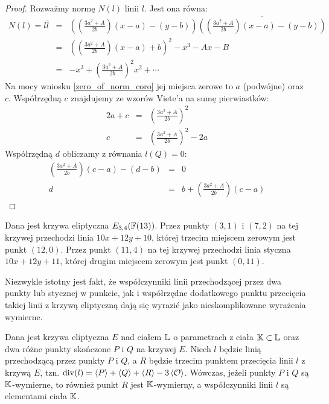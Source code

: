 \begin{proof}
Rozważmy normę $N(l)$ linii $l$. Jest ona równa:
\begin{eqnarray*}
N(l) = l\overline{l}
& = & \left(\left(\frac{3a^2 + A}{2b}\right)(x - a) - (y - b)\right)
      \overline{
      \left(\left(\frac{3a^2 + A}{2b}\right)(x - a) - (y - b)\right)
      } \\
& = & \left(\left(\frac{3a^2+A}{2b}\right)(x-a) + b\right)^2 - x^3 - Ax - B \\
& = & -x^3 + \left(\frac{3a^2+A}{2b}\right)^2x^2 + \cdots
\end{eqnarray*}
Na mocy wniosku \ref{zero_of_norm_coro}
jej miejsca zerowe to $a$ (podwójne) oraz $c$.
Współrzędną $c$ znajdujemy ze wzorów Viete'a na sumę pierwiastków:
\begin{eqnarray*}
2a + c & = & \left(\frac{3a^2+A}{2b}\right)^2 \\
     c & = & \left(\frac{3a^2+A}{2b}\right)^2 - 2a
\end{eqnarray*}
Współrzędną $d$ obliczamy z równania $l(Q) = 0$:
\begin{eqnarray*}
\left(\frac{3a^2 + A}{2b}\right)(c - a) - (d - b) & = & 0 \\
d & = & b + \left(\frac{3a^2 + A}{2b}\right)(c - a)
\end{eqnarray*}
\end{proof}

\begin{example}
Dana jest krzywa eliptyczna $E_{3,4}(\mathbb{F}(13))$.
Przez punkty $(3, 1)$ i $(7, 2)$ na tej krzywej
przechodzi linia $10x + 12y + 10$,
której trzecim miejscem zerowym jest punkt $(12, 0)$.
Przez punkt $(11, 4)$ na tej krzywej
przechodzi linia styczna $10x +12y + 11$,
której drugim miejscem zerowym jest punkt $(0, 11)$.
\end{example}

\noindent
Niezwykle istotny jest fakt,
że współczynniki linii przechodzącej przez dwa punkty
lub stycznej w punkcie,
jak i współrzędne dodatkowego punktu przecięcia
takiej linii z krzywą eliptyczną dają się wyrazić
jako nieskomplikowane wyrażenia wymierne.

\begin{fact}
Dana jest krzywa eliptyczna $E$ nad ciałem $\mathbb{L}$
o parametrach z ciała $\mathbb{K} \subset \mathbb{L}$
oraz dwa różne punkty skończone $P$ i $Q$ na krzywej $E$.
Niech $l$ będzie linią przechodzącą przez punkty $P$ i $Q$,
a $R$ będzie trzecim punktem przecięcia linii $l$ z krzywą $E$,
tzn. $\operatorname{div}(l) = \left\langle P\right\rangle + \left\langle Q\right\rangle + \left\langle R\right\rangle - 3\left\langle\mathcal{O}\right\rangle$.
Wówczas, jeżeli punkty $P$ i $Q$ są $\mathbb{K}$-wymierne,
to również punkt $R$ jest $\mathbb{K}$-wymierny,
a współczynniki linii $l$ są elementami ciała $\mathbb{K}$.
\end{fact}

